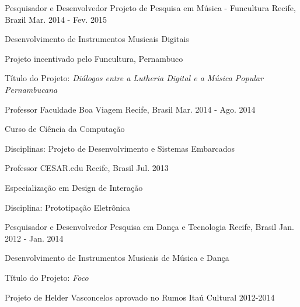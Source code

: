 \begin{cventries}
% 
\cventry
	{Pesquisador e Desenvolvedor}
	{Projeto de Pesquisa em Música - Funcultura}
	{Recife, Brazil}
	{Mar. 2014 - Fev. 2015}
	{\begin{cvitems}
		\item{Desenvolvimento de Instrumentos Musicais Digitais}
		\item{Projeto incentivado pelo Funcultura, Pernambuco}
		\item{Título do Projeto: \textit{Diálogos entre a Lutheria Digital e a Música Popular Pernambucana}}
	\end{cvitems}}

\cventry
	{Professor}
	{Faculdade Boa Viagem}
	{Recife, Brasil}
	{Mar. 2014 - Ago. 2014}
	{\begin{cvitems}
		\item{Curso de Ciência da Computação}
		\item{Disciplinas: Projeto de Desenvolvimento e Sistemas Embarcados}
	\end{cvitems}}

\cventry
	{Professor}
	{CESAR.edu}
	{Recife, Brasil}
	{Jul. 2013}
	{\begin{cvitems}
		\item{Especialização em Design de Interação}
		\item{Disciplina: Prototipação Eletrônica}
	\end{cvitems}}

\cventry
	{Pesquisador e Desenvolvedor}
	{Pesquisa em Dança e Tecnologia}
	{Recife, Brasil}
	{Jan. 2012 - Jan. 2014}
	{\begin{cvitems}
		\item{Desenvolvimento de Instrumentos Musicais de Música e Dança}
		\item{Título do Projeto: \textit{Foco}}
		\item{Projeto de Helder Vasconcelos aprovado no Rumos Itaú Cultural 2012-2014}
	\end{cvitems}}


\end{cventries}
